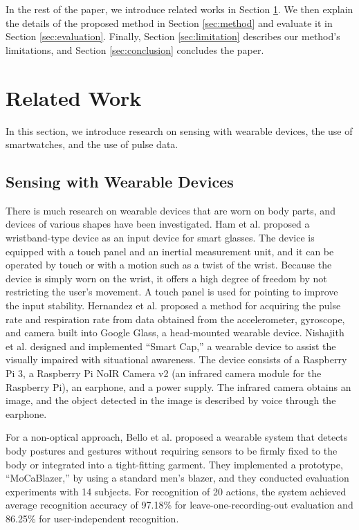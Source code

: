 \documentclass[manuscript,screen,review]{acmart}
\begin{document}
In the rest of the paper, we introduce related works in Section \ref{sec:related}. We then explain the details of the proposed method in Section \ref{sec:method} and evaluate it in Section \ref{sec:evaluation}. Finally, Section \ref{sec:limitation} describes our method's limitations, and Section \ref{sec:conclusion} concludes the paper.



\section{Related Work}
\label{sec:related}
In this section, we introduce research on sensing with wearable devices, the use of smartwatches, and the use of pulse data.

\subsection{Sensing with Wearable Devices}
There is much research on wearable devices that are worn on body parts, and devices of various shapes have been investigated. Ham et al. \cite{smart_wristband} proposed a wristband-type device as an input device for smart glasses. The device is equipped with a touch panel and an inertial measurement unit, and it can be operated by touch or with a motion such as a twist of the wrist. Because the device is simply worn on the wrist, it offers a high degree of freedom by not restricting the user's movement. A touch panel is used for pointing to improve the input stability. Hernandez et al. \cite{bioglass} proposed a method for acquiring the pulse rate and respiration rate from data obtained from the accelerometer, gyroscope, and camera built into Google Glass, a head-mounted wearable device. Nishajith et al. \cite{smart_cap} designed and implemented ``Smart Cap,'' a wearable device to assist the visually impaired with situational awareness. The device consists of a Raspberry Pi 3, a Raspberry Pi NoIR Camera v2 (an infrared camera module for the Raspberry Pi), an earphone, and a power supply. The infrared camera obtains an image, and the object detected in the image is described by voice through the earphone.\par

For a non-optical approach, Bello et al. \cite{MoCapaci} proposed a wearable system that detects body postures and gestures without requiring sensors to be firmly fixed to the body or integrated into a tight-fitting garment. They implemented a prototype, ``MoCaBlazer,'' by using a standard men's blazer, and they conducted evaluation experiments with 14 subjects. For recognition of 20 actions, the system achieved average recognition accuracy of 97.18\% for leave-one-recording-out evaluation and 86.25\% for user-independent recognition.\par
\end{document}
